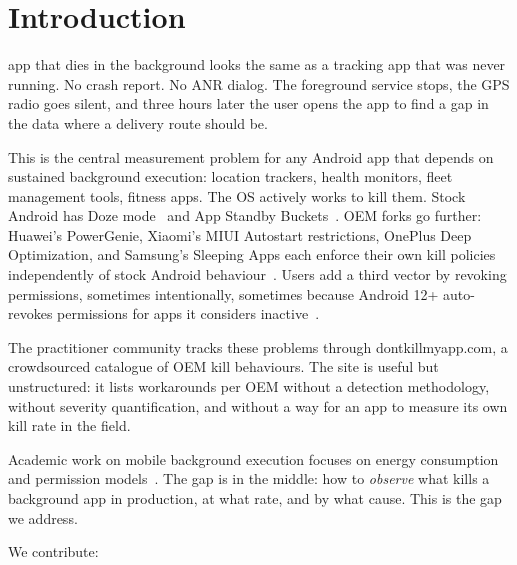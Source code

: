 \documentclass[10pt,journal,compsoc]{IEEEtran}
\begin{document}
\maketitle


\section{Introduction}
\label{sec:intro}

 app that dies in the background looks the same
as a tracking app that was never running. No crash report. No ANR dialog. The
foreground service stops, the GPS radio goes silent, and three hours
later the user opens the app to find a gap in the data where a
delivery route should be.

This is the central measurement problem for any Android app that depends
on sustained background execution: location trackers, health monitors,
fleet management tools, fitness apps. The OS actively works to kill them.
Stock Android has Doze mode~\cite{android_doze} and App Standby
Buckets~\cite{android_buckets}. OEM forks go further: Huawei's
PowerGenie, Xiaomi's MIUI Autostart restrictions, OnePlus Deep
Optimization, and Samsung's Sleeping Apps each enforce their own kill
policies independently of stock Android
behaviour~\cite{dontkillmyapp}. Users add a third vector by revoking
permissions, sometimes intentionally, sometimes because Android 12+
auto-revokes permissions for apps it considers
inactive~\cite{android_hibernate}.

The practitioner community tracks these problems through
dontkillmyapp.com, a crowdsourced catalogue of OEM kill behaviours. The
site is useful but unstructured: it lists workarounds per OEM without
a detection methodology, without severity quantification, and without a
way for an app to measure its own kill rate in the field.

Academic work on mobile background execution focuses on energy
consumption~\cite{li2014making,pathak2012energy} and permission
models~\cite{felt2012android,au2012pscout}. The gap is in the middle:
how to \emph{observe} what kills a background app in production, at what
rate, and by what cause. This is the gap we address.

We contribute:
\end{document}
